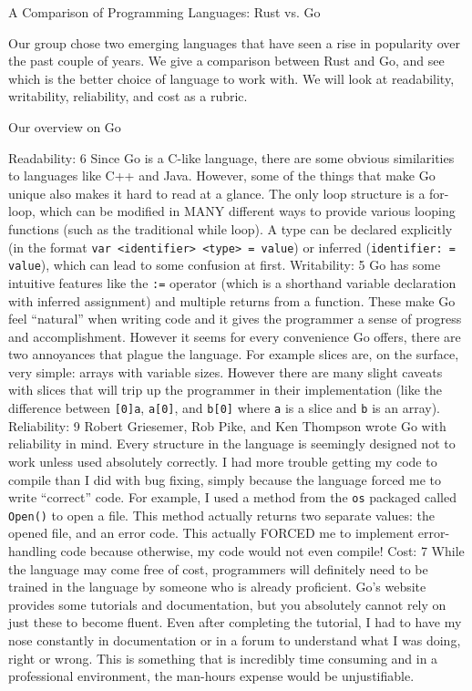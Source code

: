A Comparison of Programming Languages: Rust vs. Go

    Our group chose two emerging languages that have seen a rise in popularity over the past couple of years. We give a comparison between Rust and Go, and see which is the better choice of language to work with. We will look at readability, writability, reliability, and cost as a rubric. 

      Our overview on Go
      
Readability: 6
	Since Go is a C-like language, there are some obvious similarities to languages like C++ and Java. However, some of the things that make Go unique also makes it hard to read at a glance. The only loop structure is a for-loop, which can be modified in MANY different ways to provide various looping functions (such as the traditional while loop). A type can be declared explicitly (in the format \texttt{var <identifier> <type> = value}) or inferred (\texttt{identifier: = value}), which can lead to some confusion at first.
Writability: 5
	Go has some intuitive features like the \texttt{:=} operator (which is a shorthand variable declaration with inferred assignment) and multiple returns from a function. These make Go feel ``natural'' when writing code and it gives the programmer a sense of progress and accomplishment.
	However it seems for every convenience Go offers, there are two annoyances that plague the language. For example slices are, on the surface, very simple: arrays with variable sizes. However there are many slight caveats with slices that will trip up the programmer in their implementation (like the difference between \texttt{[0]a}, \texttt{a[0]}, and \texttt{b[0]} where \texttt{a} is a slice and \texttt{b} is an array).
Reliability: 9
	 Robert Griesemer, Rob Pike, and Ken Thompson wrote Go with reliability in mind. Every structure in the language is seemingly designed not to work unless used absolutely correctly. I had more trouble getting my code to compile than I did with bug fixing, simply because the language forced me to write ``correct'' code. For example, I used a method from the \texttt{os} packaged called \texttt{Open()} to open a file. This method actually returns two separate values: the opened file, and an error code. This actually FORCED me to implement error-handling code because otherwise, my code would not even compile!
Cost: 7
	While the language may come free of cost, programmers will definitely need to be trained in the language by someone who is already proficient. Go's website provides some tutorials and documentation, but you absolutely cannot rely on just these to become fluent. Even after completing the tutorial, I had to have my nose constantly in documentation or in a forum to understand what I was doing, right or wrong. This is something that is incredibly time consuming and in a professional environment, the man-hours expense would be unjustifiable.

